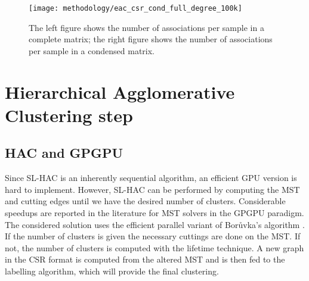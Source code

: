 \begin{figure}[hbtp]
\centering
\texttt{[image: methodology/eac\_csr\_cond\_full\_degree\_100k]}
\caption{The left figure shows the number of associations per sample in a complete matrix; the right figure shows the number of associations per sample in a condensed matrix.}
\label{fig:coassoc degree}
\end{figure}




\section{Hierarchical Agglomerative Clustering step}

\subsection{HAC and GPGPU}
Since SL-HAC is an inherently sequential algorithm, an efficient GPU version is hard to implement.
However, SL-HAC can be performed by computing the MST and cutting edges until we have the desired number of clusters.
Considerable speedups are reported in the literature for MST solvers in the GPGPU paradigm.
The considered solution uses the efficient parallel variant of Borůvka's algorithm \cite{Sousa2015}. 
If the number of clusters is given the necessary cuttings are done on the MST. 
If not, the number of clusters is computed with the lifetime technique. 
A new graph in the CSR format is computed from the altered MST and is then fed to the labelling algorithm, which will provide the final clustering.

